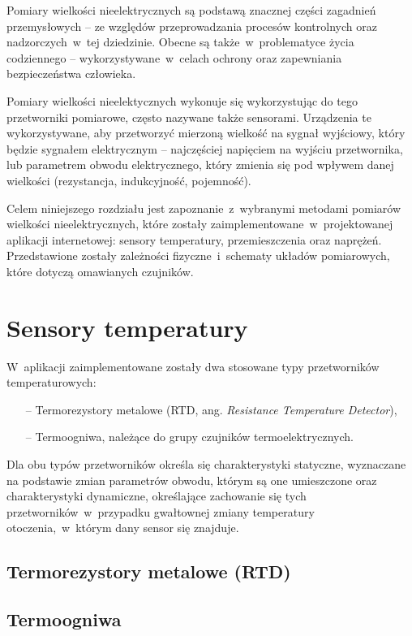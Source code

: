 Pomiary wielkości nieelektrycznych są podstawą znacznej części zagadnień przemysłowych -- ze
względów przeprowadzania procesów kontrolnych oraz nadzorczych~w~tej dziedzinie. Obecne są
także~w~problematyce życia codziennego -- wykorzystywane~w~celach ochrony oraz zapewniania
bezpieczeństwa człowieka.

Pomiary wielkości nieelektycznych wykonuje się wykorzystując do tego przetworniki pomiarowe, często
nazywane także sensorami. Urządzenia te wykorzystywane, aby przetworzyć mierzoną wielkość na sygnał
wyjściowy, który będzie sygnałem elektrycznym -- najczęściej napięciem na wyjściu przetwornika,
lub parametrem obwodu elektrycznego, który zmienia się pod wpływem danej wielkości (rezystancja,
indukcyjność, pojemność).

Celem niniejszego rozdziału jest zapoznanie~z~wybranymi metodami pomiarów wielkości
nieelektrycznych, które zostały zaimplementowane~w~projektowanej aplikacji internetowej: sensory
temperatury, przemieszczenia oraz naprężeń. Przedstawione zostały zależności fizyczne~i~schematy
układów pomiarowych, które dotyczą omawianych czujników.

\section{Sensory temperatury}
W~aplikacji zaimplementowane zostały dwa stosowane typy przetworników temperaturowych:
\begin{itemize}
  \item [--] Termorezystory metalowe (RTD, ang. \textit{Resistance Temperature Detector}),
  \item [--] Termoogniwa, należące do grupy czujników termoelektrycznych.
\end{itemize}
Dla obu typów przetworników określa się charakterystyki statyczne, wyznaczane na podstawie zmian
parametrów obwodu, którym są one umieszczone oraz charakterystyki dynamiczne, określające zachowanie
się tych przetworników~w~przypadku gwałtownej zmiany temperatury otoczenia,~w~którym dany sensor się
znajduje.

\subsection{Termorezystory metalowe (RTD)}


\subsection{Termoogniwa}



